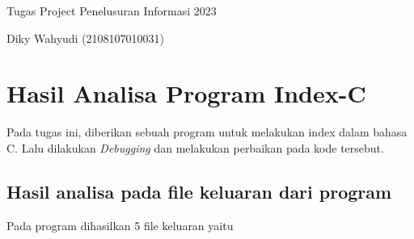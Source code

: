 \documentclass[12pt]{article}
\begin{document}
    \begin{center}
        Tugas Project Penelusuran Informasi 2023

        Diky Wahyudi (2108107010031)
    \end{center}

    \section*{Hasil Analisa Program Index-C}
    Pada tugas ini, diberikan sebuah program untuk melakukan index dalam bahasa C. Lalu dilakukan \textit{Debugging} dan melakukan perbaikan pada kode tersebut.

    \subsection*{Hasil analisa pada file keluaran dari program}
    Pada program dihasilkan 5 file keluaran yaitu
\end{document}
